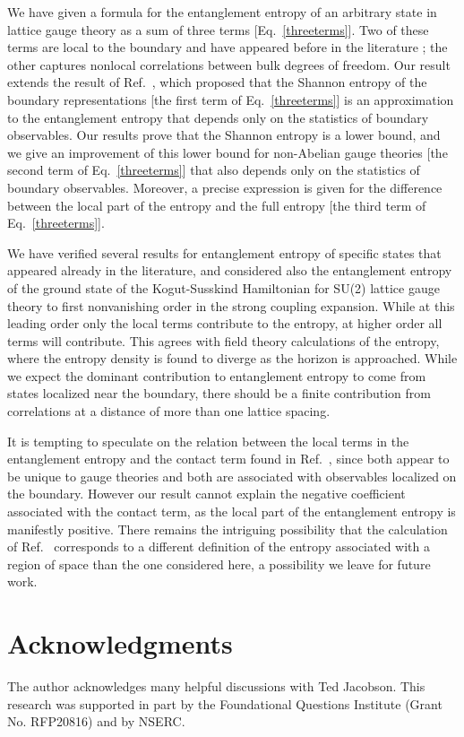 \documentclass[aps,prd,twocolumn,showpacs,groupedaddress,nofootinbib,letterpaper]{revtex4}
\begin{document}
We have given a formula for the entanglement entropy of an arbitrary state in lattice gauge theory as a sum of three terms [Eq.~\eqref{threeterms}].
Two of these terms are local to the boundary and have appeared before in the literature \cite{Buividovich2008b, Donnelly2008}; the other captures nonlocal correlations between bulk degrees of freedom.
Our result extends the result of Ref.~\cite{Buividovich2008b}, which proposed that the Shannon entropy of the boundary representations [the first term of Eq.~\eqref{threeterms}] is an approximation to the entanglement entropy that depends only on the statistics of boundary observables.
Our results prove that the Shannon entropy is a lower bound, and we give an improvement of this lower bound for non-Abelian gauge theories [the second term of Eq.~\eqref{threeterms}] that also depends only on the statistics of boundary observables.
Moreover, a precise expression is given for the difference between the local part of the entropy and the full entropy [the third term of Eq.~\eqref{threeterms}].

We have verified several results for entanglement entropy of specific states that appeared already in the literature, and considered also the entanglement entropy of the ground state of the Kogut-Susskind Hamiltonian for SU(2) lattice gauge theory to first nonvanishing order in the strong coupling expansion.
While at this leading order only the local terms contribute to the entropy, at higher order all terms will contribute.
This agrees with field theory calculations of the entropy, where the entropy density is found to diverge as the horizon is approached.
While we expect the dominant contribution to entanglement entropy to come from states localized near the boundary, there should be a finite contribution from correlations at a distance of more than one lattice spacing.

It is tempting to speculate on the relation between the local terms in the entanglement entropy and the contact term found in Ref.~\cite{Kabat1995}, since both appear to be unique to gauge theories and both are associated with observables localized on the boundary.
However our result cannot explain the negative coefficient associated with the contact term, as the local part of the entanglement entropy is manifestly positive.
There remains the intriguing possibility that the calculation of Ref.~\cite{Kabat1995} corresponds to a different definition of the entropy associated with a region of space than the one considered here, a possibility we leave for future work.

\section*{Acknowledgments}
The author acknowledges many helpful discussions with Ted Jacobson.
This research was supported in part by the Foundational Questions Institute (Grant No. RFP20816) and by NSERC.



\end{document}
